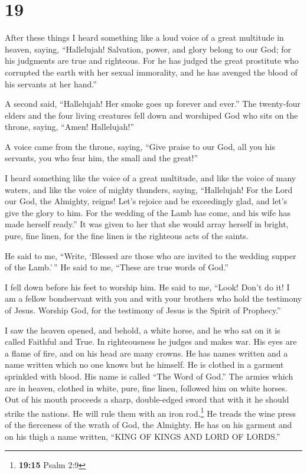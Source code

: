 \hypertarget{section-18}{%
\section{19}\label{section-18}}

 After these things I heard something like a loud voice of
a great multitude in heaven, saying, ``Hallelujah! Salvation, power, and
glory belong to our God;  for his judgments are true and
righteous. For he has judged the great prostitute who corrupted the
earth with her sexual immorality, and he has avenged the blood of his
servants at her hand.''

 A second said, ``Hallelujah! Her smoke goes up forever
and ever.''  The twenty-four elders and the four living
creatures fell down and worshiped God who sits on the throne, saying,
``Amen! Hallelujah!''

 A voice came from the throne, saying, ``Give praise to
our God, all you his servants, you who fear him, the small and the
great!''

 I heard something like the voice of a great multitude,
and like the voice of many waters, and like the voice of mighty
thunders, saying, ``Hallelujah! For the Lord our God, the Almighty,
reigns!  Let's rejoice and be exceedingly glad, and let's
give the glory to him. For the wedding of the Lamb has come, and his
wife has made herself ready.''  It was given to her that
she would array herself in bright, pure, fine linen, for the fine linen
is the righteous acts of the saints.

 He said to me, ``Write, `Blessed are those who are
invited to the wedding supper of the Lamb.'\,'' He said to me, ``These
are true words of God.''

 I fell down before his feet to worship him. He said to
me, ``Look! Don't do it! I am a fellow bondservant with you and with
your brothers who hold the testimony of Jesus. Worship God, for the
testimony of Jesus is the Spirit of Prophecy.''

 I saw the heaven opened, and behold, a white horse, and
he who sat on it is called Faithful and True. In righteousness he judges
and makes war.  His eyes are a flame of fire, and on his
head are many crowns. He has names written and a name written which no
one knows but he himself.  He is clothed in a garment
sprinkled with blood. His name is called ``The Word of God.''
 The armies which are in heaven, clothed in white, pure,
fine linen, followed him on white horses.  Out of his
mouth proceeds a sharp, double-edged sword that with it he should strike
the nations. He will rule them with an iron rod.\footnote{\textbf{19:15}
  Psalm 2:9} He treads the wine press of the fierceness of the wrath of
God, the Almighty.  He has on his garment and on his
thigh a name written, ``KING OF KINGS AND LORD OF LORDS.''

